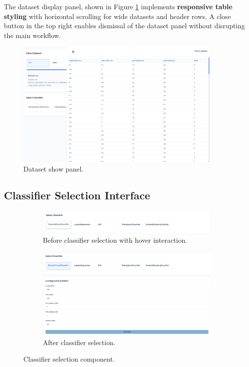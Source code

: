 The dataset display panel, shown in Figure \ref{fig:showDatasetPanel} implements \textbf{responsive table styling} with horizontal scrolling for wide datasets and header rows. A close button in the top right enables dismissal of the dataset panel without disrupting the main workflow.

\begin{figure}[htbp]
  \centering
  \includegraphics[width=0.9\textwidth]{images/showdatasetpanel.png}
  \caption{Dataset show panel.}
  \label{fig:showDatasetPanel}
\end{figure}

\subsection{Classifier Selection Interface}

\begin{figure}[htbp]
    \centering
    \begin{subfigure}[c]{\textwidth}
        \centering
        \includegraphics[width=\textwidth]{images/classifierSelectionComponentBefore.png}
        \caption{Before classifier selection with hover interaction.}
    \end{subfigure}
    \vfill
    \begin{subfigure}[c]{\textwidth}
        \centering
        \includegraphics[width=\textwidth]{images/classifierSelectionComponentAfter.png}
        \caption{After classifier selection.}
    \end{subfigure}

    \caption{Classifier selection component.}
    \label{fig:classifierSelectionGrid}
\end{figure}

